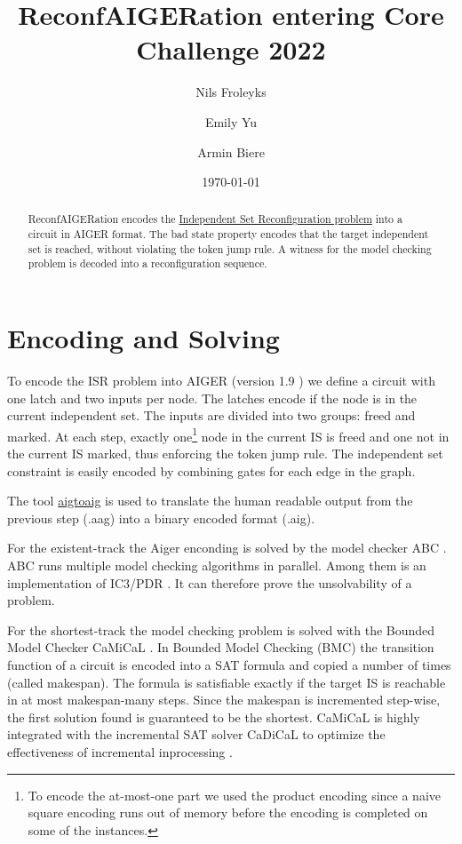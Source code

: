 \documentclass[11pt]{article}
\author{Nils Froleyks}
\date{\today}
\title{ReconfAIGERation entering Core Challenge 2022}
\begin{document}
\thispagestyle{empty}
\author[1]{Emily Yu}
\author[2]{Armin Biere}
\maketitle

\begin{abstract}
ReconfAIGERation encodes the \href{https://core-challenge.github.io/2022/\#the-independent-set-reconfiguration-isr-problem}{Independent Set Reconfiguration problem} into a circuit in AIGER format. The bad state property encodes that the target independent set is reached, without violating the token jump rule. A witness for the model checking problem is decoded into a reconfiguration sequence.
\end{abstract}

\thispagestyle{empty}
\section*{Encoding and Solving}
\label{sec:org71e5b64}
To encode the ISR problem into AIGER (version 1.9 \autocite{Biere-FMV-TR-11-2}) we define a circuit with one latch and two inputs per node. The latches encode if the node is in the current independent set. The inputs are divided into two groups: freed and marked. At each step, exactly one\footnote{To encode the at-most-one part we used the product encoding \autocite{chenNewSATEncoding2010} since a naive square encoding runs out of memory before the encoding is completed on some of the instances.} node in the current IS is freed and one not in the current IS marked, thus enforcing the token jump rule. The independent set constraint is easily encoded by combining gates for each edge in the graph.

The tool \href{https://github.com/arminbiere/aiger}{aigtoaig} is used to translate the human readable output from the previous step (.aag) into a binary encoded format (.aig).

For the existent-track the Aiger enconding is solved by the model checker ABC \autocite{braytonABCAcademicIndustrialStrength2010}. ABC runs multiple model checking algorithms in parallel. Among them is an implementation of IC3/PDR \autocite{bradleySATBasedModelChecking2011}. It can therefore prove the unsolvability of a problem.

For the shortest-track the model checking problem is solved with the Bounded Model Checker CaMiCaL \autocite{fazekasIncrementalInprocessingSAT2019}. In Bounded Model Checking (BMC) the transition function of a circuit is encoded into a SAT formula and copied a number of times (called makespan).
The formula is satisfiable exactly if the target IS is reachable in at most makespan-many steps. Since the makespan is incremented step-wise, the first solution found is guaranteed to be the shortest.
CaMiCaL is highly integrated with the incremental SAT solver CaDiCaL \autocite{biereEnteringSATCompetition2020} to optimize the effectiveness of incremental inprocessing \autocite{fazekasIncrementalInprocessingSAT2019}.
\end{document}
